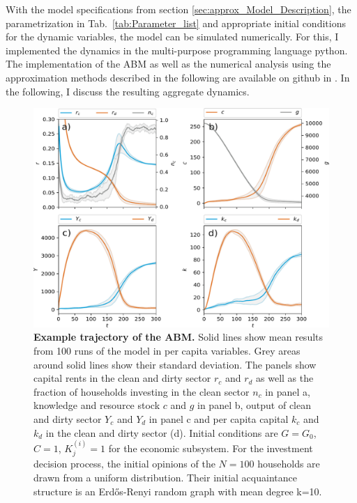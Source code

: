 With the model specifications from section \ref{sec:approx_Model_Description}, the parametrization in Tab.~\ref{tab:Parameter_list} and appropriate initial conditions for the dynamic variables, the model can be simulated numerically.
For this, I implemented the dynamics in the multi-purpose programming language python. The implementation of the ABM as well as the numerical analysis using the approximation methods described in the following are available on github in \cite{kolb2018}.
In the following, I discuss the resulting aggregate dynamics.

\begin{figure}[ht]
  \centering\includegraphics[width=.85\linewidth]{figures/example_trajectory.pdf}
  \caption{\textbf{Example trajectory of the ABM.} Solid lines show mean results from 100 runs of the model in per capita variables. Grey areas around solid lines show their standard deviation. The panels show capital rents in the clean and dirty sector $r_c$ and $r_d$ as well as the fraction of households investing in the clean sector $n_c$ in panel a, knowledge and resource stock $c$ and $g$ in panel b, output of clean and dirty sector $Y_c$ and $Y_d$ in panel c and per capita capital $k_c$ and $k_d$ in the clean and dirty sector (d).
Initial conditions are $G=G_0$, $C=1$, $K_j^{(i)}=1$ for the economic subsystem. For the investment decision process, the initial opinions of the $N=100$ households are drawn from a uniform distribution. Their initial acquaintance structure is an Erd\H{o}s-Renyi random graph with mean degree k=10.}
\label{fig:example_trajectory}
\end{figure}

